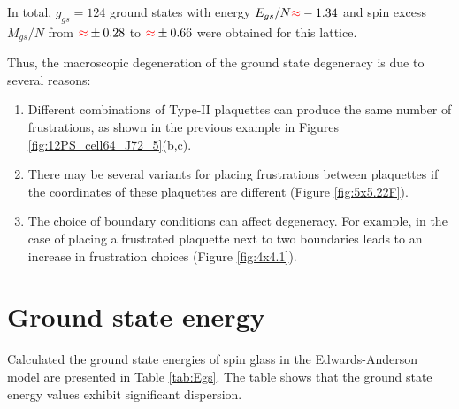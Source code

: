 \documentclass[preprint,12pt]{elsarticle}
\begin{document}
	In total, $g_{gs}=124$ ground states with energy $E_{gs}/N\textcolor{red}{\approx}-1.34$ and spin excess $M_{gs}/N$ from $\textcolor{red}{\approx}\pm 0.28$ to $\textcolor{red}{\approx}\pm 0.66$ were obtained for this lattice. 
	
	Thus, the macroscopic degeneration of the ground state degeneracy is due to several reasons:
	
	\begin{enumerate}
		\item Different combinations of Type-II plaquettes can produce the same number of frustrations, as shown in the previous example in Figures \ref{fig:12PS_cell64_J72_5}(b,c).
		\item There may be several variants for placing frustrations between plaquettes if the coordinates of these plaquettes are different (Figure \ref{fig:5x5.22F}).
		\item The choice of boundary conditions can affect degeneracy. For example, in the case of placing a frustrated plaquette next to two boundaries leads to an increase in frustration choices (Figure \ref{fig:4x4.1}).
	\end{enumerate}
	
	\section{Ground state energy}
	
	Calculated the ground state energies of spin glass in the Edwards-Anderson model are presented in Table \ref{tab:Egs}. The table shows that the ground state energy values exhibit significant dispersion.
	
\end{document}
